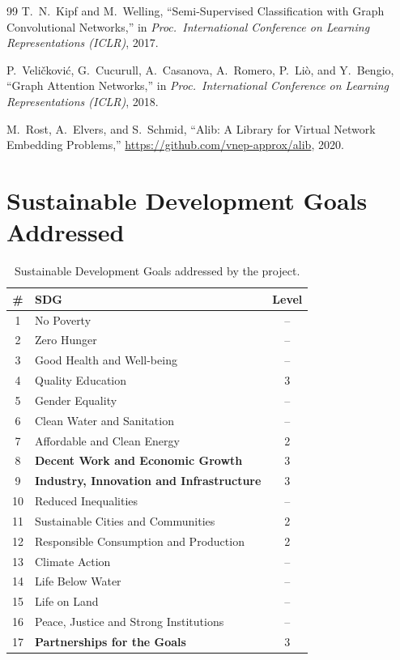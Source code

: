 \documentclass[12pt,a4paper]{report}
\begin{document}
\begin{thebibliography}{99}
T.\ N.\ Kipf and M.\ Welling,
``Semi-Supervised Classification with Graph Convolutional Networks,''
in \textit{Proc.\ International Conference on Learning Representations (ICLR)},
2017.

P.\ Veli\v{c}kovi\'{c}, G.\ Cucurull, A.\ Casanova, A.\ Romero, P.\ Li\`{o}, and
Y.\ Bengio,
``Graph Attention Networks,''
in \textit{Proc.\ International Conference on Learning Representations (ICLR)},
2018.

M.\ Rost, A.\ Elvers, and S.\ Schmid,
``Alib: A Library for Virtual Network Embedding Problems,''
\url{https://github.com/vnep-approx/alib},
2020.

\end{thebibliography}

\appendix

\chapter{Sustainable Development Goals Addressed}
\label{app:sdg}

\begin{table}[ht]
\centering
\renewcommand{\arraystretch}{1.4}
\begin{tabular}{|c|>{\centering\arraybackslash}m{7cm}|c|}
\hline
\textbf{\#} & \textbf{SDG} & \textbf{Level} \\
\hline
1  & No Poverty & -- \\
\hline
2  & Zero Hunger & -- \\
\hline
3  & Good Health and Well-being & -- \\
\hline
4  & Quality Education & 3 \\
\hline
5  & Gender Equality & -- \\
\hline
6  & Clean Water and Sanitation & -- \\
\hline
7  & Affordable and Clean Energy & 2 \\
\hline
8  & \textbf{Decent Work and Economic Growth} & 3 \\
\hline
9  & \textbf{Industry, Innovation and Infrastructure} & 3 \\
\hline
10 & Reduced Inequalities & -- \\
\hline
11 & Sustainable Cities and Communities & 2 \\
\hline
12 & Responsible Consumption and Production & 2 \\
\hline
13 & Climate Action & -- \\
\hline
14 & Life Below Water & -- \\
\hline
15 & Life on Land & -- \\
\hline
16 & Peace, Justice and Strong Institutions & -- \\
\hline
17 & \textbf{Partnerships for the Goals} & 3 \\
\hline
\end{tabular}
\caption{Sustainable Development Goals addressed by the project.}
\label{tab:sdg}
\end{table}
\end{document}

